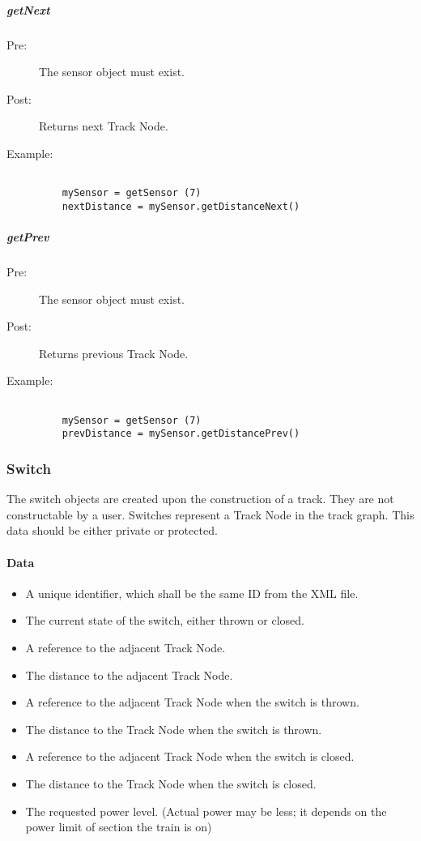 \documentclass[a4paper,11pt,notitlepage]{article}
\def\TN{Track Node\xspace}
\begin{document}
\subparagraph{getNext}
\begin{description}
\item[\hspace{1cm}Pre:] The sensor object must exist.
\item[\hspace{1cm}Post:] Returns next \TN.
\item[\hspace{1cm}Example:]
\begin{verbatim}

    mySensor = getSensor (7)
    nextDistance = mySensor.getDistanceNext()
\end{verbatim}
\end{description}

\subparagraph{getPrev}
\begin{description}
\item[\hspace{1cm}Pre:] The sensor object must exist.
\item[\hspace{1cm}Post:] Returns previous \TN.
\item[\hspace{1cm}Example:]
\begin{verbatim}

    mySensor = getSensor (7)
    prevDistance = mySensor.getDistancePrev()
\end{verbatim}
\end{description}


\subsubsection{Switch}
The switch objects are created upon the construction of a track. They are not constructable by a user. Switches represent a \TN in the track graph. This data should be either private or protected.
\paragraph{Data}
\begin{itemize}
\item A unique identifier, which shall be the same ID from the XML file.
\item The current state of the switch, either thrown or closed.
\item A reference to the adjacent \TN.
\item The distance to the adjacent \TN.
\item A reference to the adjacent \TN when the switch is thrown.
\item The distance to the \TN when the switch is thrown.
\item A reference to the adjacent \TN when the switch is closed.
\item The distance to the \TN when the switch is closed.
\item The requested power level. (Actual power may be less; it depends on the power limit of section the train is on)
\end{itemize}
\end{document}
